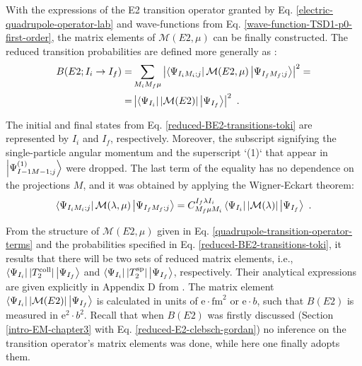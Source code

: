With the expressions of the E2 transition operator granted by Eq. \ref{electric-quadrupole-operator-lab} and wave-functions from Eq. \ref{wave-function-TSD1-p0-first-order}, the matrix elements of $\mathcal{M}(E2,\mu)$ can be finally constructed. The reduced transition probabilities are defined more generally as \cite{toki1975asymmetric}:
\begin{align}
    B(E2;I_i\to I_f)=&\sum_{M_iM_f\mu}\left|\bra{\Psi_{I_iM_i;j}}\mathcal{M}(E2,\mu)\ket{\Psi_{I_fM_f;j}}\right|^2=\nonumber\\
                                            =&\left|\bra{\Psi_{I_i}}\left|\mathcal{M}(E2)\right|\ket{\Psi_{I_f}}\right|^2\ .
    \label{reduced-BE2-transitions-toki}
\end{align}

The initial and final states from Eq. \ref{reduced-BE2-transitions-toki} are represented by $I_i$ and $I_f$, respectively. Moreover, the subscript signifying the single-particle angular momentum and the superscript `(1)` that appear in $\ket{\Psi_{I-1M-1;j}^{(1)}}$ were dropped. The last term of the equality has no dependence on the projections $M$, and it was obtained by applying the Wigner-Eckart theorem:
\begin{align}
    \bra{\Psi_{I_iM_i;j}}\mathcal{M}(\lambda,\mu)\ket{\Psi_{I_fM_f;j}}=C_{M_f\mu M_i}^{I_f\lambda I_i}\bra{\Psi_{I_i}}|\mathcal{M}(\lambda)|\ket{\Psi_{I_f}}\ .
\end{align}  

From the structure of $\mathcal{M}(E2,\mu)$ given in Eq. \ref{quadrupole-transition-operator-terms} and the probabilities specified in Eq. \ref{reduced-BE2-transitions-toki}, it results that there will be two sets of reduced matrix elements, i.e., $\bra{\Psi_{I_i}}|T_2^\text{coll}|\ket{\Psi_{I_f}}$ and $\bra{\Psi_{I_i}}|T_2^\text{sp}|\ket{\Psi_{I_f}}$, respectively.  Their analytical expressions are given explicitly in Appendix D from \cite{raduta2017semiclassical}. The matrix element $\bra{\Psi_{I_i}}|\mathcal{M}(E2)|\ket{\Psi_{I_f}}$ is calculated in units of $\mathrm{e}\cdot\text{fm}^2$ or $\mathrm{e}\cdot b$, such that $B(E2)$ is measured in $\mathrm{e}^2\cdot b^2$. Recall that when $B(E2)$ was firstly discussed (Section \ref{intro-EM-chapter3} with Eq. \ref{reduced-E2-clebsch-gordan}) no inference on the transition operator's matrix elements was done, while here one finally adopts them.

